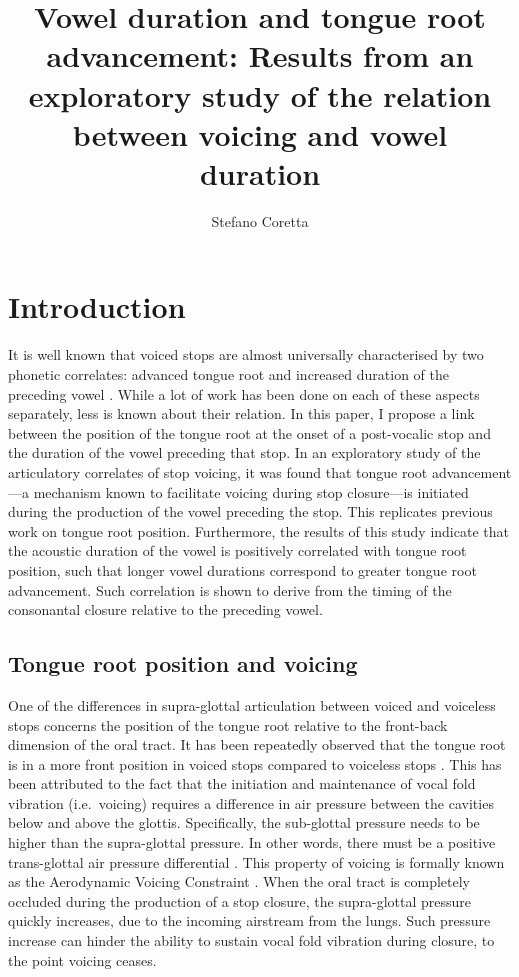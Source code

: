 \documentclass[12pt,]{article}
\title{Vowel duration and tongue root advancement: Results from an exploratory
study of the relation between voicing and vowel duration}
\author{Stefano Coretta}
\date{}
\begin{document}
\maketitle

\hypertarget{introduction}{%
\section{Introduction}\label{introduction}}

It is well known that voiced stops are almost universally characterised
by two phonetic correlates: advanced tongue root and increased duration
of the preceding vowel \citep{westbury1983, lisker1974, fowler1992}.
While a lot of work has been done on each of these aspects separately,
less is known about their relation. In this paper, I propose a link
between the position of the tongue root at the onset of a post-vocalic
stop and the duration of the vowel preceding that stop. In an
exploratory study of the articulatory correlates of stop voicing, it was
found that tongue root advancement---a mechanism known to facilitate
voicing during stop closure---is initiated during the production of the
vowel preceding the stop. This replicates previous work on tongue root
position. Furthermore, the results of this study indicate that the
acoustic duration of the vowel is positively correlated with tongue root
position, such that longer vowel durations correspond to greater tongue
root advancement. Such correlation is shown to derive from the timing of
the consonantal closure relative to the preceding vowel.

\hypertarget{tongue-root-position-and-voicing}{%
\subsection{Tongue root position and
voicing}\label{tongue-root-position-and-voicing}}

One of the differences in supra-glottal articulation between voiced and
voiceless stops concerns the position of the tongue root relative to the
front-back dimension of the oral tract. It has been repeatedly observed
that the tongue root is in a more front position in voiced stops
compared to voiceless stops \citep{kent1969, perkell1969, westbury1983}.
This has been attributed to the fact that the initiation and maintenance
of vocal fold vibration (i.e.~voicing) requires a difference in air
pressure between the cavities below and above the glottis. Specifically,
the sub-glottal pressure needs to be higher than the supra-glottal
pressure. In other words, there must be a positive trans-glottal air
pressure differential \citep{berg1958, rothenberg1967}. This property of
voicing is formally known as the Aerodynamic Voicing Constraint
\citep{ohala2011}. When the oral tract is completely occluded during the
production of a stop closure, the supra-glottal pressure quickly
increases, due to the incoming airstream from the lungs. Such pressure
increase can hinder the ability to sustain vocal fold vibration during
closure, to the point voicing ceases.
\end{document}
